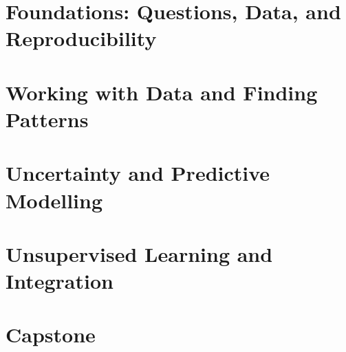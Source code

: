 \documentclass[11pt,oneside,a4paper]{report}
\begin{document}
\utpfrontmatter

\renewcommand{\thechapter}{1A}
\renewcommand{\theHchapter}{setup.1A}


\renewcommand{\thechapter}{1B}
\renewcommand{\theHchapter}{setup.1B}


\setcounter{chapter}{1}
\renewcommand{\thechapter}{\arabic{chapter}}
\renewcommand{\theHchapter}{\arabic{chapter}}

\part{Foundations: Questions, Data, and Reproducibility}



\part{Working with Data and Finding Patterns}




\part{Uncertainty and Predictive Modelling}





\part{Unsupervised Learning and Integration}


\part{Capstone}

\end{document}
